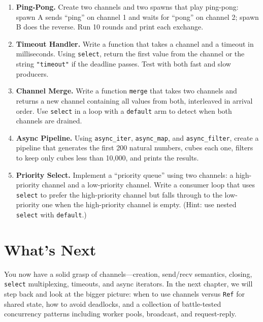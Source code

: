 \begin{enumerate}[label=\textbf{\arabic*.}]

  \item \textbf{Ping-Pong.} Create two channels and two spawns that play ping-pong: spawn A sends ``ping'' on channel 1 and waits for ``pong'' on channel 2; spawn B does the reverse. Run 10 rounds and print each exchange.

  \item \textbf{Timeout Handler.} Write a function that takes a channel and a timeout in milliseconds. Using \lstinline|select|, return the first value from the channel or the string \lstinline|"timeout"| if the deadline passes. Test with both fast and slow producers.

  \item \textbf{Channel Merge.} Write a function \lstinline|merge| that takes two channels and returns a new channel containing all values from both, interleaved in arrival order. Use \lstinline|select| in a loop with a \lstinline|default| arm to detect when both channels are drained.

  \item \textbf{Async Pipeline.} Using \lstinline|async_iter|, \lstinline|async_map|, and \lstinline|async_filter|, create a pipeline that generates the first 200 natural numbers, cubes each one, filters to keep only cubes less than 10,000, and prints the results.

  \item \textbf{Priority Select.} Implement a ``priority queue'' using two channels: a high-priority channel and a low-priority channel. Write a consumer loop that uses \lstinline|select| to prefer the high-priority channel but falls through to the low-priority one when the high-priority channel is empty. (Hint: use nested \lstinline|select| with \lstinline|default|.)

\end{enumerate}

\section*{What's Next}

You now have a solid grasp of channels---creation, send/recv semantics, closing, \lstinline|select| multiplexing, timeouts, and async iterators.
In the next chapter, we will step back and look at the bigger picture: when to use channels versus \lstinline|Ref| for shared state, how to avoid deadlocks, and a collection of battle-tested concurrency patterns including worker pools, broadcast, and request-reply.
